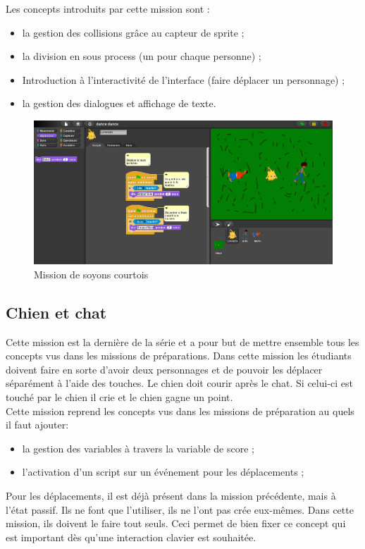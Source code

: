 Les concepts introduits par cette mission sont :
\begin{itemize}
\item la gestion des collisions grâce au capteur de sprite ;
\item la division en sous process (un pour chaque personne) ;
\item Introduction à l'interactivité de l'interface (faire déplacer un personnage) ;
\item la gestion des dialogues et affichage de texte.
\end{itemize}
\begin{figure}[ht]
  \begin{center}
    \includegraphics[scale=0.3]{content/7-solution/1-missions/images/courtois}
    \caption{Mission de soyons courtois}
    \label{fig:courtois}
  \end{center}
\end{figure}
\subsection{Chien et chat}
\label{chien-chat}
Cette mission est la dernière de la série et a pour but de mettre ensemble tous les concepts vus dans les missions de préparations. Dans cette mission les étudiants doivent faire en sorte d'avoir deux personnages et de pouvoir les déplacer séparément à l'aide des touches. Le chien doit courir après le chat. Si celui-ci est touché par le chien il crie et le chien gagne un point.\\

Cette mission reprend les concepts vus dans les missions de préparation au quels il faut ajouter:
\begin{itemize}
\item la gestion des variables à travers la variable de score ;
\item l'activation d'un script sur un événement pour les déplacements ;
\end{itemize}

Pour les déplacements, il est déjà présent dans la mission précédente, mais à l'état passif. Ils ne font que l'utiliser, ils ne l'ont pas crée eux-mêmes. Dans cette mission, ils doivent le faire tout seuls. Ceci permet de bien fixer ce concept qui est important dès qu'une interaction clavier est souhaitée.

